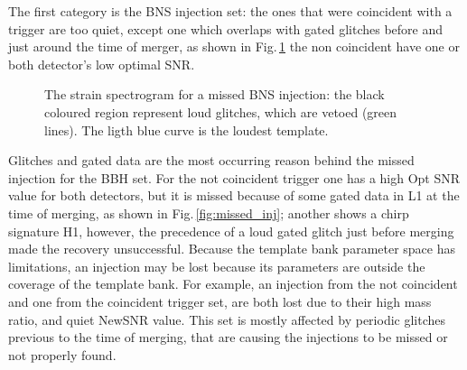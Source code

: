 \documentclass[binding=0.6cm, LaM]{sapthesis}
\begin{document}
	The first category is the BNS injection set: 
	the ones that were coincident with a trigger are too quiet,
	except one which overlaps with gated glitches before and just around the time of merger, as shown in Fig.\,\ref{fig:gated_glitch}
	the non coincident have one or both detector's low optimal SNR.
 		\begin{figure}[h]
                        \noindent
                        \label{gated_glitch}
                        \centering
                        \caption{The strain spectrogram for a missed BNS injection: the black coloured region represent loud glitches, which are vetoed (green lines). The ligth blue curve is the loudest template. }
                         \label{fig:gated_glitch}
                \end{figure}
	Glitches and gated data are the most occurring reason behind the missed injection for the BBH set.
	For the not coincident trigger one has a high Opt SNR value for both detectors, 
	but it is missed because of some gated data in L1 at the time of merging, as shown in Fig.\,\ref{fig:missed_inj};
 	another shows a chirp signature H1, however, the precedence of a loud gated glitch just before merging
	made the recovery  unsuccessful.
	Because the template bank  parameter space has limitations,
	an injection may be lost because its parameters are outside the coverage 
	of the template bank. 
	For example, an injection from the not coincident and one from the coincident trigger set, 
	are both lost due to their high mass ratio, and quiet NewSNR value.
	This set is mostly affected by	 periodic glitches previous to the time of merging,
	that are  causing the injections to be missed  or not properly found.                
\end{document}
